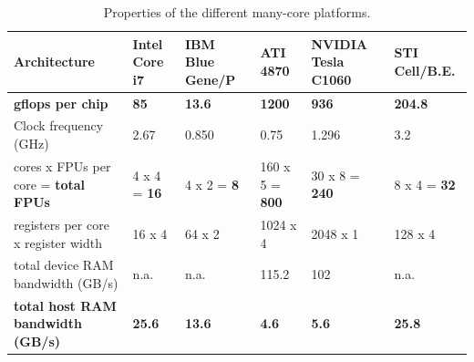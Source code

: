\documentclass{article}
\begin{document}
\begin{table}[t]
\begin{center}
{\footnotesize
\begin{tabular}{|l|l|l|l|l|l|}                                                   
\hline
Architecture                                 & Intel Core i7 & IBM Blue Gene/P& ATI 4870 &  NVIDIA Tesla C1060 & STI Cell/B.E. \\
\hline
\textbf{gflops per chip}                     & \textbf{85}   & \textbf{13.6}  & \textbf{1200}  & \textbf{936}  & \textbf{204.8}\\
Clock frequency (GHz)                        & 2.67          & 0.850          & 0.75           & 1.296         & 3.2           \\
cores x FPUs per core = \textbf{total FPUs}  & 4 x 4 = \textbf{16} & 4 x 2 = \textbf{8} & 160 x 5 = \textbf{800} & 30 x 8 = \textbf{240} & 8 x 4 = \textbf{32} \\
registers per core x register width          & 16 x 4        & 64 x 2         & 1024 x 4      & 2048 x 1       & 128 x 4       \\
total device RAM bandwidth (GB/s)            & n.a.          & n.a.           & 115.2         & 102            & n.a.          \\
\textbf{total host RAM bandwidth (GB/s)}     & \textbf{25.6} & \textbf{13.6}  & \textbf{4.6}  & \textbf{5.6}   & \textbf{25.8} \\
\hline
\end{tabular}
} %
\end{center}
\vspace{-0.5cm}
\caption{Properties of the different many-core platforms.}
\label{architecture-properties}
\end{table}
\end{document}
